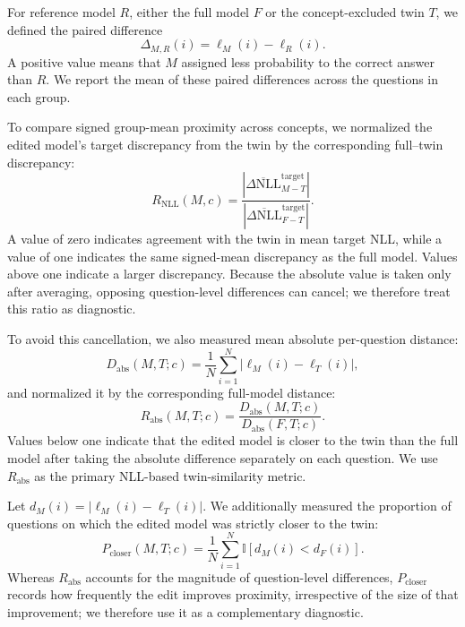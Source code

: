 For reference model $R$, either the full model $F$ or the concept-excluded twin
$T$, we defined the paired difference
\begin{equation}
\Delta_{M,R}(i)=\ell_M(i)-\ell_R(i).
\end{equation}
A positive value means that $M$ assigned less probability to the correct
answer than $R$. We report the mean of these paired differences across the
questions in each group.

To compare signed group-mean proximity across concepts, we normalized the
edited model's target discrepancy from the twin by the corresponding
full--twin discrepancy:
\begin{equation}
R_{\mathrm{NLL}}(M,c)
=
\frac{
\left|
\overline{\Delta\mathrm{NLL}}^{\mathrm{target}}_{M-T}
\right|
}{
\left|
\overline{\Delta\mathrm{NLL}}^{\mathrm{target}}_{F-T}
\right|
}.
\end{equation}
A value of zero indicates agreement with the twin in mean target NLL, while a
value of one indicates the same signed-mean discrepancy as the full model.
Values above one indicate a larger discrepancy. Because the absolute value is
taken only after averaging, opposing question-level differences can cancel;
we therefore treat this ratio as diagnostic.

To avoid this cancellation, we also measured mean absolute per-question
distance:
\begin{equation}
D_{\mathrm{abs}}(M,T;c)
=
\frac{1}{N}
\sum_{i=1}^{N}
\left|\ell_M(i)-\ell_T(i)\right|,
\end{equation}
and normalized it by the corresponding full-model distance:
\begin{equation}
R_{\mathrm{abs}}(M,T;c)
=
\frac{D_{\mathrm{abs}}(M,T;c)}
{D_{\mathrm{abs}}(F,T;c)}.
\end{equation}
Values below one indicate that the edited model is closer to the twin than the
full model after taking the absolute difference separately on each question.
We use $R_{\mathrm{abs}}$ as the primary NLL-based twin-similarity metric.

Let $d_M(i)=|\ell_M(i)-\ell_T(i)|$. We additionally measured the proportion
of questions on which the edited model was strictly closer to the twin:
\begin{equation}
P_{\mathrm{closer}}(M,T;c)
=
\frac{1}{N}
\sum_{i=1}^{N}
\mathbb{I}\!\left[d_M(i)<d_F(i)\right].
\end{equation}
Whereas $R_{\mathrm{abs}}$ accounts for the magnitude of question-level
differences, $P_{\mathrm{closer}}$ records how frequently the edit improves
proximity, irrespective of the size of that improvement; we therefore use it
as a complementary diagnostic.

